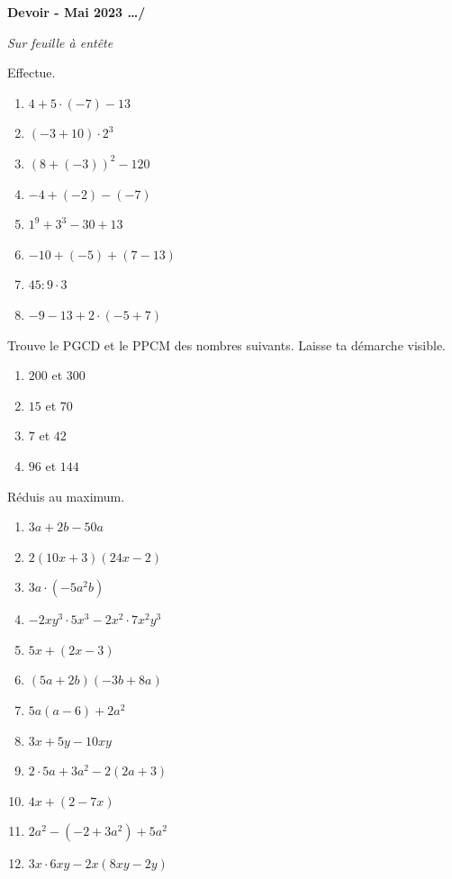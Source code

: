 \documentclass[12pt,parskip=half-, twoside=semi]{scrartcl}
\newcommand{\montitre}{Devoir - Mai 2023}
\begin{document}
\begin{huge}
    \bfseries
    \montitre
    \hfill
    \dots/
    \bigbreak
\end{huge}

\emph{Sur feuille à entête}

\begin{exercise}[points=8]
	Effectue. 
	\begin{enumerate}[cols=2, itemsep=.2cm]
		\item \(4+5\cdot (-7)-13\)
		\item \(\left(-3+10\right)\cdot 2^3\)
		\item \(\left(8+(-3)\right)^2 - 120\)
		\item \(-4+(-2)-(-7)\)
		\item \(1^9 + 3^3 - 30 + 13\)
		\item \(-10+(-5) + \left(7-13\right)\)
		\item \(45:9\cdot 3 \)
		\item \(-9-13+2\cdot (-5+7)\)
	\end{enumerate}	
\end{exercise}

\begin{exercise}[points=4]
    Trouve le PGCD et le PPCM des nombres suivants. Laisse ta démarche visible.
    \begin{enumerate}[cols=4]
        \item $200$ et $300$
        \item $15$ et $ 70$
        \item $7$ et $42$
        \item $96$ et $144$
    \end{enumerate}
\end{exercise}

\begin{exercise}[points=12]
    Réduis au maximum. 
    \begin{enumerate}[cols=2]
        \item $3a + 2b - 50a$
        \item $2(10x+3)(24x-2)$
        \item $3a \cdot (-5a^2b)$
        \item $-2xy^3 \cdot 5x^3 - 2x^2 \cdot 7x^2y^3$
        \item $5x+(2x-3)$
        \item $(5a+2b)(-3b+8a)$
        \item $5a(a-6) + 2a^2$
        \item $3x+5y-10xy$
        \item \(2\cdot 5a + 3a^2 - 2(2a+3)\)
        \item \(4x + (2 - 7x)  \)
        \item \(2a^2 - (-2 + 3a^2) + 5a^2 \)
        \item \(3x \cdot 6xy - 2x (8xy - 2y)\)
    \end{enumerate}
\end{exercise}
\end{document}
